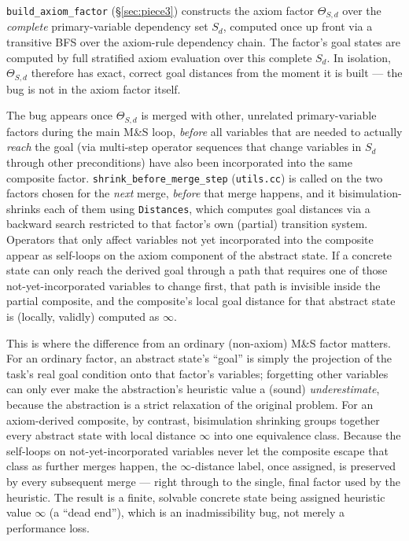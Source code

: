 \documentclass[11pt,a4paper]{article}
\begin{document}
\texttt{build\_axiom\_factor} (\S\ref{sec:piece3}) constructs the axiom factor
$\Theta_{S,d}$ over the \emph{complete} primary-variable dependency set $S_d$,
computed once up front via a transitive BFS over the axiom-rule dependency
chain. The factor's goal states are computed by full stratified axiom
evaluation over this complete $S_d$. In isolation, $\Theta_{S,d}$ therefore
has exact, correct goal distances from the moment it is built --- the bug is
not in the axiom factor itself.

The bug appears once $\Theta_{S,d}$ is merged with other, unrelated
primary-variable factors during the main M\&S loop, \emph{before} all
variables that are needed to actually \emph{reach} the goal (via multi-step
operator sequences that change variables in $S_d$ through other
preconditions) have also been incorporated into the same composite factor.
\texttt{shrink\_before\_merge\_step} (\texttt{utils.cc}) is called on the two
factors chosen for the \emph{next} merge, \emph{before} that merge happens,
and it bisimulation-shrinks each of them using \texttt{Distances}, which
computes goal distances via a backward search restricted to that factor's
own (partial) transition system. Operators that only affect variables not
yet incorporated into the composite appear as self-loops on the axiom
component of the abstract state. If a concrete state can only reach the
derived goal through a path that requires one of those not-yet-incorporated
variables to change first, that path is invisible inside the partial
composite, and the composite's local goal distance for that abstract state
is (locally, validly) computed as $\infty$.

This is where the difference from an ordinary (non-axiom) M\&S factor
matters. For an ordinary factor, an abstract state's ``goal'' is simply the
projection of the task's real goal condition onto that factor's variables;
forgetting other variables can only ever make the abstraction's heuristic
value a (sound) \emph{underestimate}, because the abstraction is a strict
relaxation of the original problem. For an axiom-derived composite, by
contrast, bisimulation shrinking groups together every abstract state with
local distance $\infty$ into one equivalence class. Because the self-loops
on not-yet-incorporated variables never let the composite escape that class
as further merges happen, the $\infty$-distance label, once assigned, is
preserved by every subsequent merge --- right through to the single, final
factor used by the heuristic. The result is a finite, solvable concrete
state being assigned heuristic value $\infty$ (a ``dead end''), which is an
inadmissibility bug, not merely a performance loss.
\end{document}
